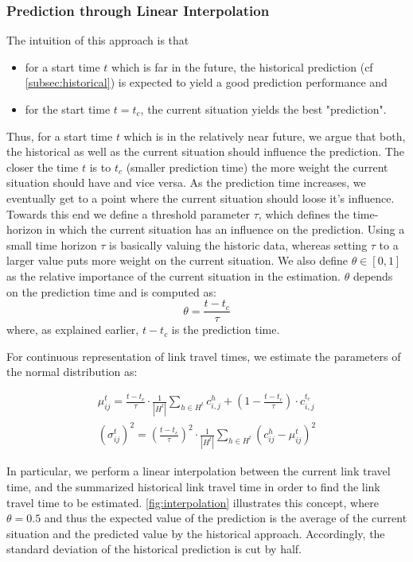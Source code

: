 \subsubsection{Prediction through Linear Interpolation}
\label{subsec:LI}
The intuition of this approach is that 
\begin{itemize}
  \item for a start time $t$ which is far in the future, the historical prediction (cf \cref{subsec:historical}) is expected to yield a good prediction performance and
\item for the start time $t = t_c$, the current situation yields the best "prediction".
\end{itemize}

Thus, for a start time $t$ which is in the relatively near future, we argue that both, the historical as well as the current situation should influence the prediction. The closer the time $t$ is to $t_c$ (smaller prediction time) the more weight the current situation should have and vice versa. As the prediction time increases, we eventually get to a point where the current situation should loose it's influence. Towards this end we define a threshold parameter $\tau$, which defines the time-horizon in which the current situation has an influence on the prediction. Using a small time horizon $\tau$ is basically valuing the historic data, whereas setting $\tau$ to a larger value
puts more weight on the current situation. We also define $\theta \in [0,1]$ as the relative importance of the current situation in the estimation. $\theta$ depends on the prediction time and is computed as:
\begin{equation}
\theta = \frac{t-t_c}{\tau}
\end{equation}
where, as explained earlier, $t-t_c$ is the prediction time.

For continuous representation of link travel times, we estimate the parameters of the normal distribution as:

\begin{gather}
	\mu_{ij}^t = \frac{t - t_c}{\tau}\cdot\frac{1}{|H^t|}\sum_{h\in H^t} c_{i,j}^h
	+ (1-\frac{t - t_c}{\tau})\cdot c_{i,j}^{t_c}\\
	(\sigma_{ij}^t)^2 = (\frac{t - t_c}{\tau})^2 \cdot \frac{1}{|H^t|}\sum_{h\in H^t}
	(c_{ij}^h-\mu_{ij}^t)^2
\end{gather}

In particular, we perform a linear interpolation between the current link travel time, and the summarized historical link travel time in order to find the link travel time to be estimated. \cref{fig:interpolation} illustrates this concept, where  $\theta = 0.5$ and thus the expected value of the prediction is the average of the current situation and the predicted value by the historical approach. Accordingly, the standard deviation of the historical prediction is cut by half.

